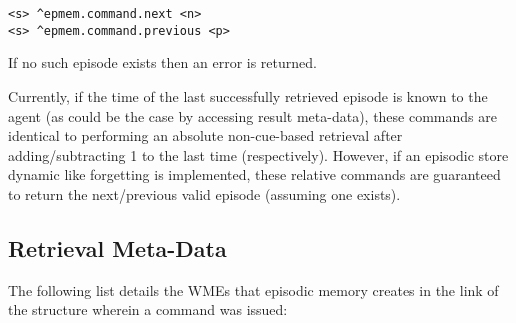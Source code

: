 \begin{verbatim}
<s> ^epmem.command.next <n>
<s> ^epmem.command.previous <p>
\end{verbatim}

If no such episode exists then an error is returned.

Currently, if the time of the last successfully retrieved episode is known to the agent (as could be the case by accessing result meta-data), these commands are identical to performing an absolute non-cue-based retrieval after adding/subtracting 1 to the last time (respectively).
However, if an episodic store dynamic like forgetting is implemented, these relative commands are guaranteed to return the next/previous valid episode (assuming one exists).

\subsection{Retrieval Meta-Data}
\label{EPMEM-meta}

The following list details the WMEs that episodic memory creates in the  link of the  structure wherein a command was issued:

